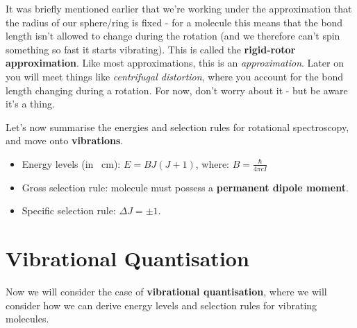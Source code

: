 \documentclass{memoir}[11pt,oneside,a4paper,openany]
\newenvironment{myexampleblock}[1]{%
    \tcolorbox[beamer,%
    noparskip,breakable,
    colback=LightGreen,colframe=DarkGreen,%
    colbacklower=LimeGreen!75!LightGreen,%
    title=#1]}%
    {\endtcolorbox}
\begin{document}
It was briefly mentioned earlier that we're working under the approximation that the radius of our sphere/ring is fixed - for a molecule this means that the bond length isn't allowed to change during the rotation (and we therefore can't spin something so fast it starts vibrating). This is called the \textbf{rigid-rotor approximation}. Like most approximations, this is an \emph{approximation}. Later on you will meet things like \emph{centrifugal distortion}, where you account for the bond length changing during a rotation. For now, don't worry about it - but be aware it's a thing.

Let's now summarise the energies and selection rules for rotational spectroscopy, and move onto \textbf{vibrations}.
\begin{myexampleblock}{\begin{center}Rotational Spectroscopy\end{center}}
	\begin{center}
		\begin{itemize}
			\item Energy levels (in \si{\per\centi\metre}): $E = BJ(J+1)$, where: $B = \frac{\hbar}{4\pi cI}$
			\item Gross selection rule: molecule must possess a \textbf{permanent dipole moment}.
			\item Specific selection rule: $\Delta J = \pm 1$.
		\end{itemize}
		\end{center}
\end{myexampleblock}

\section{Vibrational Quantisation}
Now we will consider the case of \textbf{vibrational quantisation}, where we will consider how we can derive energy levels and selection rules for vibrating molecules.
\end{document}
